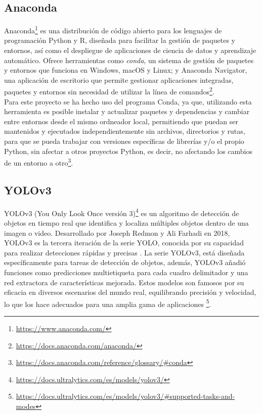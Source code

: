 \subsection{Anaconda}
\label{sec:Anaconda}

Anaconda\footnote{\url{https://www.anaconda.com/}} es una distribución de código abierto para los lenguajes de programación Python y R, diseñada para facilitar la gestión de paquetes y entornos, así como el despliegue de aplicaciones de ciencia de datos y aprendizaje automático. Ofrece herramientas como \textit{conda}, un sistema de gestión de paquetes y entornos que funciona en Windows, macOS y Linux; y Anaconda Navigator, una aplicación de escritorio que permite gestionar aplicaciones integradas, paquetes y entornos sin necesidad de utilizar la línea de comandos\footnote{\url{https://docs.anaconda.com/anaconda/}}.\\ 

Para este proyecto se ha hecho uso del programa Conda, ya que, utilizando esta herramienta es posible instalar y actualizar paquetes y dependencias y cambiar entre entornos desde el mismo ordneador local, permitiendo que puedan ser mantenidos y ejecutados independientemente sin archivos, directorios y rutas, para que se pueda trabajar con versiones específicas de librerías y/o el propio Python, sin afectar a otros proyectos Python, es decir, no afectando los cambios de un entorno a otro\footnote{\url{https://docs.anaconda.com/reference/glossary/\#conda}}.

\subsection{YOLOv3}
\label{sec:YOLOv3}

YOLOv3 (You Only Look Once versión 3)\footnote{\url{https://docs.ultralytics.com/es/models/yolov3/}} es un algoritmo de detección de objetos en tiempo real que identifica y localiza múltiples objetos dentro de una imagen o video. Desarrollado por Joseph Redmon y Ali Farhadi en 2018, YOLOv3 es la tercera iteración de la serie YOLO, conocida por su capacidad para realizar detecciones rápidas y precisas \cite{Redmon18}. %
La serie YOLOv3, está diseñada específicamente para tareas de detección de objetos, además, YOLOv3 añadió funciones como predicciones multietiqueta para cada cuadro delimitador y una red extractora de características mejorada. Estos modelos son famosos por su eficacia en diversos escenarios del mundo real, equilibrando precisión y velocidad, lo que los hace adecuados para una amplia gama de aplicaciones \footnote{\url{https://docs.ultralytics.com/es/models/yolov3/\#supported-tasks-and-modes}}.\\


